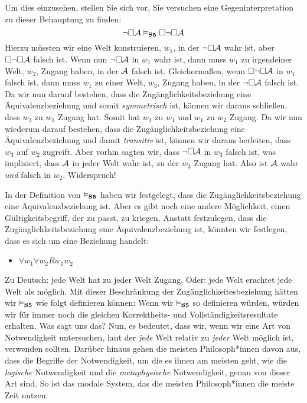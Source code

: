 Um dies einzusehen, stellen Sie sich vor, Sie versuchen eine Gegeninterpretation zu dieser Behauptung zu finden:
\[
\neg\Box\mathcal{A} \vDash_{\mathbf{S5}}  \Box \neg\Box \mathcal{A}
\]
Hierzu müssten wir eine Welt konstruieren, $w_1$, in der $\neg\Box\mathcal{A}$ wahr ist, aber $\Box \neg\Box \mathcal{A}$ falsch ist. Wenn nun $\neg\Box\mathcal{A}$ in $w_1$ wahr ist, dann muss $w_1$ zu irgendeiner Welt, $w_2$, Zugang haben, in der $\mathcal{A}$ falsch ist. Gleicherma{\ss}en, wenn $\Box \neg\Box \mathcal{A}$ in $w_1$ falsch ist, dann muss $w_1$ zu einer Welt, $w_3$, Zugang haben, in der $\neg\Box \mathcal{A}$ falsch ist. Da wir nun darauf bestehen, dass die Zugänglichkeitsbeziehung eine Äquivalenzbeziehung und somit \emph{symmetrisch} ist, können wir daraus schlie{\ss}en, dass $w_3$ zu $w_1$ Zugang hat. Somit hat $w_3$ zu $w_1$ und $w_1$ zu $w_2$ Zugang. Da wir nun wiederum darauf bestehen, dass die Zugänglichkeitsbeziehung eine Äquivalenzbeziehung und damit \emph{transitiv} ist, können wir daraus herleiten, dass $w_3$ auf $w_2$ zugreift. Aber vorhin sagten wir, dass $\neg\Box \mathcal{A}$ in $w_3$ falsch ist, was impliziert, dass $\mathcal{A}$ in jeder Welt wahr ist, zu der $w_3$ Zugang hat. Also ist $\mathcal{A}$ wahr \emph{und} falsch in $w_2$. Widerspruch!

In der Definition von $\vDash_{\mathbf{S5}} $ haben wir festgelegt, dass die Zugänglichkeitsbeziehung eine Äquivalenzbeziehung ist. Aber es gibt noch eine andere Möglichkeit, einen Gültigkeitsbegriff, der zu \mlSfive{} passt, zu kriegen. Anstatt festzulegen, dass die Zugänglichkeitsbeziehung eine Äquivalenzbeziehung ist, könnten wir festlegen, dass es sich um eine  Beziehung handelt:
\begin{itemize}
	\item $\forall w_1\forall w_2Rw_1w_2$
\end{itemize}
Zu Deutsch: jede Welt hat zu jeder Welt Zugang. Oder: jede Welt erachtet jede Welt als möglich. Mit dieser Beschränkung der Zugänglichkeitesbeziehung hätten wir $\vDash_{\mathbf{S5}} $ wie folgt definieren können:
Wenn wir $\vDash_{\mathbf{S5}}$ so definieren würden, würden wir für \mlSfive{} immer noch die gleichen Korrektheits- und Vollständigkeitsresultate erhalten. Was sagt uns das? Nun, es bedeutet, dass wir, wenn wir eine Art von Notwendigkeit untersuchen, laut der \emph{jede} Welt relativ zu \emph{jeder} Welt möglich ist, \mlSfive{} verwenden sollten. Darüber hinaus gehen die meisten Philosoph*innen davon aus, dass die Begriffe der Notwendigkeit, um die es ihnen am meisten geht, wie die \emph{logische} Notwendigkeit und die \emph{metaphysische} Notwendigkeit, genau von dieser Art sind. So ist \mlSfive{} das modale System, das die meisten Philosoph*innen die meiste Zeit nutzen.

